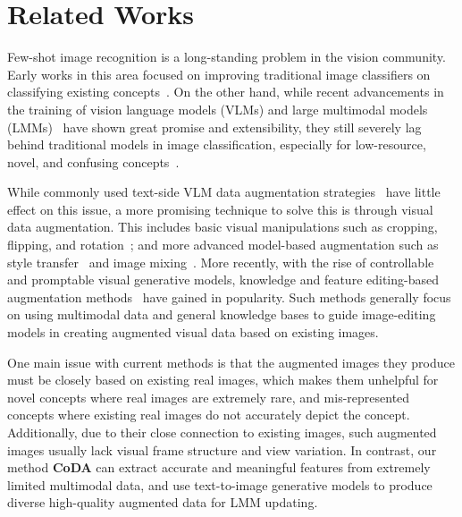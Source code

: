 \section{Related Works}
\label{sec:related_work}

Few-shot image recognition is a long-standing problem in the vision community. Early works in this area focused on improving traditional image classifiers on classifying existing concepts~\cite{vinyals2016matching, finn2017model, nichol2018first, dhillon2019baseline, tian2020rethinking, bhagat2023sample, afrasiyabi2022matching}. On the other hand, while recent advancements in the training of vision language models (VLMs) and large multimodal models (LMMs)~\cite{2023GPT4VisionSC, team2023gemini, hurst2024gpt4o, liu2023llava, liu2023improvedllava, liu2024llavanext} have shown great promise and extensibility, they still severely lag behind traditional models in image classification, especially for low-resource, novel, and confusing concepts~\cite{zhang2024visually, cooper2024rethinking}. 


While commonly used text-side VLM data augmentation strategies~\cite{yuksekgonul2022and, yang2023alip, liu2024synthvlm, sharifzadeh2024synth} have little effect on this issue, a more promising technique to solve this is through visual data augmentation. This includes basic visual manipulations such as cropping, flipping, and rotation~\cite{yang2022image, kumar2024image}; and more advanced model-based augmentation such as style transfer~\cite{zheng2019stada, chun2021styleaugment} and image mixing~\cite{uddin2020saliencymix,xie2021cut,hao2023mixgen}. More recently, with the rise of controllable and promptable visual generative models, knowledge and feature editing-based augmentation methods~\cite{liu2022learning,wu2023towards,jin2024armada} have gained in popularity. Such methods generally focus on using multimodal data and general knowledge bases to guide image-editing models in creating augmented visual data based on existing images.


One main issue with current methods is that the augmented images they produce must be closely based on existing real images, which makes them unhelpful for novel concepts where real images are extremely rare, and mis-represented concepts where existing real images do not accurately depict the concept. Additionally, due to their close connection to existing images, such augmented images usually lack visual frame structure and view variation. In contrast, our method \textbf{CoDA} can extract accurate and meaningful features from extremely limited multimodal data, and use text-to-image generative models to produce diverse high-quality augmented data for LMM updating. 


